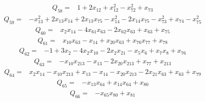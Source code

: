 \begin{equation*}\begin{aligned}
Q_{58}={}& 1+2x_{12}+x_{12}^{2}-x_{72}^{2}+x_{73}
\end{aligned}\end{equation*}
\begin{equation*}\begin{aligned}
Q_{59}={}& -x_{13}^{2}+2x_{13}x_{14}+2x_{13}x_{75}-x_{14}^{2}-2x_{14}x_{75}-x_{73}^{2}+x_{74}-x_{75}^{2}
\end{aligned}\end{equation*}
\begin{equation*}\begin{aligned}
Q_{60}={}& x_{2}x_{14}-4x_{61}x_{63}-2x_{62}x_{63}+x_{63}+x_{75}
\end{aligned}\end{equation*}
\begin{equation*}\begin{aligned}
Q_{61}={}& x_{10}x_{63}-x_{14}+x_{20}x_{63}+x_{76}x_{77}+x_{78}
\end{aligned}\end{equation*}
\begin{equation*}\begin{aligned}
Q_{62}={}& -1+3x_{2}-4x_{2}x_{10}-2x_{2}x_{21}-x_{5}x_{6}+x_{7}x_{8}+x_{76}
\end{aligned}\end{equation*}
\begin{equation*}\begin{aligned}
Q_{63}={}& -x_{10}x_{213}-x_{13}-2x_{20}x_{213}+x_{77}+x_{213}
\end{aligned}\end{equation*}
\begin{equation*}\begin{aligned}
Q_{64}={}& x_{2}x_{14}-x_{10}x_{213}+x_{13}-x_{14}-x_{20}x_{213}-2x_{21}x_{63}+x_{63}+x_{79}
\end{aligned}\end{equation*}
\begin{equation*}\begin{aligned}
Q_{65}={}& -x_{13}x_{64}+x_{14}x_{64}+x_{80}
\end{aligned}\end{equation*}
\begin{equation*}\begin{aligned}
Q_{66}={}& -x_{65}x_{80}+x_{81}
\end{aligned}\end{equation*}
